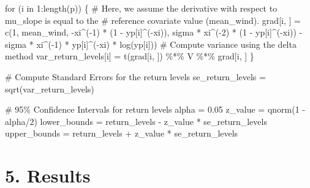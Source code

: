 \documentclass[
  letterpaper,
  DIV=11,
  numbers=noendperiod]{scrartcl}
\newenvironment{Shaded}{\begin{snugshade}}{\end{snugshade}}
\newcommand{\CommentTok}[1]{\textcolor[rgb]{0.37,0.37,0.37}{#1}}
\newcommand{\ControlFlowTok}[1]{\textcolor[rgb]{0.00,0.23,0.31}{#1}}
\newcommand{\DecValTok}[1]{\textcolor[rgb]{0.68,0.00,0.00}{#1}}
\newcommand{\FloatTok}[1]{\textcolor[rgb]{0.68,0.00,0.00}{#1}}
\newcommand{\FunctionTok}[1]{\textcolor[rgb]{0.28,0.35,0.67}{#1}}
\newcommand{\NormalTok}[1]{\textcolor[rgb]{0.00,0.23,0.31}{#1}}
\newcommand{\OtherTok}[1]{\textcolor[rgb]{0.00,0.23,0.31}{#1}}
\newcommand{\SpecialCharTok}[1]{\textcolor[rgb]{0.37,0.37,0.37}{#1}}
\begin{document}
\begin{Shaded}
\begin{Highlighting}[]
\ControlFlowTok{for}\NormalTok{ (i }\ControlFlowTok{in} \DecValTok{1}\SpecialCharTok{:}\FunctionTok{length}\NormalTok{(p)) \{}
    \CommentTok{\# Here, we assume the derivative with respect to mu\_slope is equal to the}
    \CommentTok{\# reference covariate value (mean\_wind).}
\NormalTok{    grad[i, ] }\OtherTok{=} \FunctionTok{c}\NormalTok{(}\DecValTok{1}\NormalTok{, mean\_wind, }\SpecialCharTok{{-}}\NormalTok{xi}\SpecialCharTok{\^{}}\NormalTok{(}\SpecialCharTok{{-}}\DecValTok{1}\NormalTok{) }\SpecialCharTok{*}\NormalTok{ (}\DecValTok{1} \SpecialCharTok{{-}}\NormalTok{ yp[i]}\SpecialCharTok{\^{}}\NormalTok{(}\SpecialCharTok{{-}}\NormalTok{xi)), sigma }\SpecialCharTok{*}\NormalTok{ xi}\SpecialCharTok{\^{}}\NormalTok{(}\SpecialCharTok{{-}}\DecValTok{2}\NormalTok{) }\SpecialCharTok{*}\NormalTok{ (}\DecValTok{1} \SpecialCharTok{{-}}
\NormalTok{        yp[i]}\SpecialCharTok{\^{}}\NormalTok{(}\SpecialCharTok{{-}}\NormalTok{xi)) }\SpecialCharTok{{-}}\NormalTok{ sigma }\SpecialCharTok{*}\NormalTok{ xi}\SpecialCharTok{\^{}}\NormalTok{(}\SpecialCharTok{{-}}\DecValTok{1}\NormalTok{) }\SpecialCharTok{*}\NormalTok{ yp[i]}\SpecialCharTok{\^{}}\NormalTok{(}\SpecialCharTok{{-}}\NormalTok{xi) }\SpecialCharTok{*} \FunctionTok{log}\NormalTok{(yp[i]))}
    \CommentTok{\# Compute variance using the delta method}
\NormalTok{    var\_return\_levels[i] }\OtherTok{=} \FunctionTok{t}\NormalTok{(grad[i, ]) }\SpecialCharTok{\%*\%}\NormalTok{ V }\SpecialCharTok{\%*\%}\NormalTok{ grad[i, ]}
\NormalTok{\}}

\CommentTok{\# Compute Standard Errors for the return levels}
\NormalTok{se\_return\_levels }\OtherTok{=} \FunctionTok{sqrt}\NormalTok{(var\_return\_levels)}

\CommentTok{\# 95\% Confidence Intervals for return levels}
\NormalTok{alpha }\OtherTok{=} \FloatTok{0.05}
\NormalTok{z\_value }\OtherTok{=} \FunctionTok{qnorm}\NormalTok{(}\DecValTok{1} \SpecialCharTok{{-}}\NormalTok{ alpha}\SpecialCharTok{/}\DecValTok{2}\NormalTok{)}
\NormalTok{lower\_bounds }\OtherTok{=}\NormalTok{ return\_levels }\SpecialCharTok{{-}}\NormalTok{ z\_value }\SpecialCharTok{*}\NormalTok{ se\_return\_levels}
\NormalTok{upper\_bounds }\OtherTok{=}\NormalTok{ return\_levels }\SpecialCharTok{+}\NormalTok{ z\_value }\SpecialCharTok{*}\NormalTok{ se\_return\_levels}
\end{Highlighting}
\end{Shaded}

\section{5. Results}\label{results}
\end{document}
